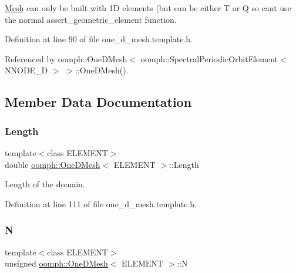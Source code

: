 \hyperlink{classoomph_1_1Mesh}{Mesh} can only be built with 1D elements (but can be either T or Q so can\textquotesingle{}t use the normal assert\+\_\+geometric\+\_\+element function. 

Definition at line 90 of file one\+\_\+d\+\_\+mesh.\+template.\+h.



Referenced by oomph\+::\+One\+D\+Mesh$<$ oomph\+::\+Spectral\+Periodic\+Orbit\+Element$<$ N\+N\+O\+D\+E\+\_\+D $>$ $>$\+::\+One\+D\+Mesh().



\subsection{Member Data Documentation}
\mbox{\label{classoomph_1_1OneDMesh_a9c5ebabd7b2286b5f489563b1106e1b4}} 
\subsubsection{\texorpdfstring{Length}{Length}}
{\footnotesize\ttfamily template$<$class E\+L\+E\+M\+E\+NT$>$ \\
double \hyperlink{classoomph_1_1OneDMesh}{oomph\+::\+One\+D\+Mesh}$<$ E\+L\+E\+M\+E\+NT $>$\+::Length\hspace{0.3cm}{\ttfamily [protected]}}



Length of the domain. 



Definition at line 111 of file one\+\_\+d\+\_\+mesh.\+template.\+h.

\mbox{\label{classoomph_1_1OneDMesh_a6f6f4087d7dd7417c79f39f2c3a2865a}} 
\subsubsection{\texorpdfstring{N}{N}}
{\footnotesize\ttfamily template$<$class E\+L\+E\+M\+E\+NT$>$ \\
unsigned \hyperlink{classoomph_1_1OneDMesh}{oomph\+::\+One\+D\+Mesh}$<$ E\+L\+E\+M\+E\+NT $>$\+::N\hspace{0.3cm}{\ttfamily [protected]}}



